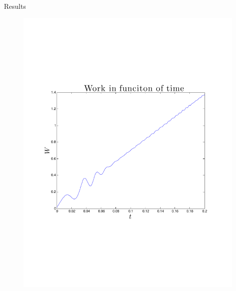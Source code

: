 \begin{frame}{Results}
\begin{minipage}{0.49\textwidth}
\begin{block}{}
        	  			\vspace{-1.7cm}
        	  				\begin{figure}
        	  						\centering
        	  						\includegraphics[width=\textwidth]{../src/plot/langevin/workInFunctionOfTimeUnerDamped.pdf}
        	  					\end{figure}
        	  		  	\end{block}
        	  	\end{minipage}
        	  	
\end{frame}
